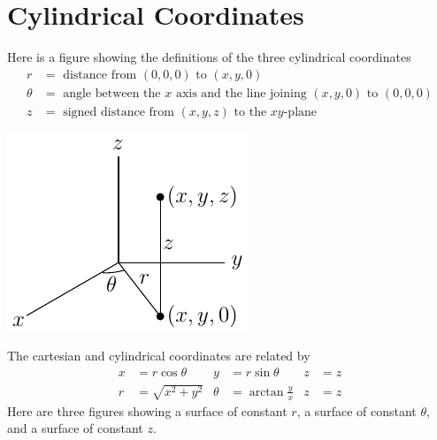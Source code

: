 \section{Cylindrical Coordinates}\label{ap:cylCoord}

Here is a figure showing the definitions of the 
three cylindrical coordinates 
\begin{align*}
r&=\text{ distance from }(0,0,0)\text{ to }(x,y,0)\\
\theta&=\text{ angle between the $x$ axis and the line joining $(x,y,0)$ to $(0,0,0)$}\\
z&=\text{ signed distance from }(x,y,z)
\text{ to the $xy$-plane}
\end{align*}
\begin{efig}
\begin{center}
    \includegraphics{cyl1.pdf}
\end{center}
\end{efig}
The cartesian and cylindrical coordinates
are related by
\begin{align*}
x&=r\cos\theta &
y&=r\sin\theta &
z&=z \\
    r&=\sqrt{x^2+y^2} &
    \theta&=\arctan\frac{y}{x} &
    z&=z
\end{align*}
Here are three figures showing a surface of constant $r$,
a surface of constant $\theta$, and a surface of constant $z$.
